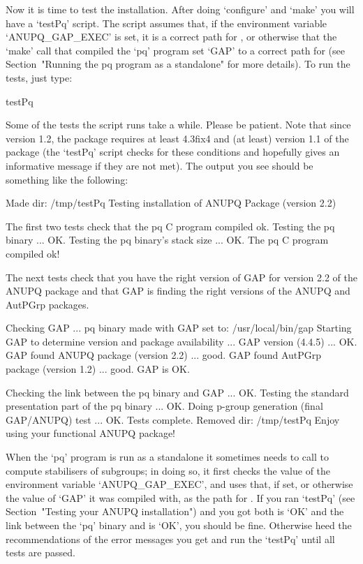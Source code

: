 
Now it is time to test the  installation.  After  doing  `configure'  and
`make' you will have a `testPq' script. The script assumes that,  if  the
environment variable `ANUPQ_GAP_EXEC' is set, it is a  correct  path  for
{\GAP}, or otherwise that the `make' call that compiled the  `pq' program
set `GAP' to a correct path  for  {\GAP}  (see  Section~"Running  the  pq
program as a standalone" for more details). To run the tests, just type:

\begintt
testPq
\endtt

Some of the tests the script runs take a while. Please be  patient.  Note
that since version 1.2, the {\ANUPQ} package  requires  at  least  {\GAP}
4.3fix4 and (at  least)  version  1.1  of  the  {\AutPGrp}  package  (the
`testPq' script checks  for  these  conditions  and  hopefully  gives  an
informative message if they are not met). The output you  see  should  be
something like the following:

\begintt
Made dir: /tmp/testPq
Testing installation of ANUPQ Package (version 2.2)
 
The first two tests check that the pq C program compiled ok.
Testing the pq binary ... OK.
Testing the pq binary's stack size ... OK.
The pq C program compiled ok!
 
The next tests check that you have the right version of GAP
for version 2.2 of the ANUPQ package and that GAP is finding
the right versions of the ANUPQ and AutPGrp packages.
 
Checking GAP ...
 pq binary made with GAP set to: /usr/local/bin/gap
 Starting GAP to determine version and package availability ...
  GAP version (4.4.5) ... OK.
  GAP found ANUPQ package (version 2.2) ... good.
  GAP found AutPGrp package (version 1.2) ... good.
 GAP is OK.
 
Checking the link between the pq binary and GAP ... OK.
Testing the standard presentation part of the pq binary ... OK.
Doing p-group generation (final GAP/ANUPQ) test ... OK.
Tests complete.
Removed dir: /tmp/testPq
Enjoy using your functional ANUPQ package!
\endtt


When the `pq' program is run as a standalone it sometimes  needs  to call
{\GAP} to compute stabilisers of subgroups; in doing so, it first  checks
the value of the environment variable `ANUPQ_GAP_EXEC', and uses that, if
set, or otherwise the value of `GAP' it was compiled with,  as  the  path
for  {\GAP}.  If  you  ran  `testPq'  (see  Section~"Testing  your  ANUPQ
installation") and you got both {\GAP} is `OK' and the link  between  the
`pq' binary and {\GAP} is `OK', you should be fine.  Otherwise  heed  the
recommendations of the error messages you get and run the `testPq'  until
all tests are passed.

